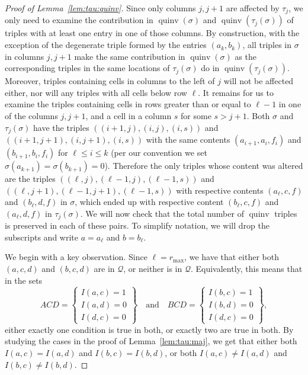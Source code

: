 \documentclass[11pt]{article}
\theoremstyle{definition}
\numberwithin{equation}{section}
\DeclareMathOperator{\quinv}{quinv}
\newcommand{\cQ}{\mathcal{Q}}
\begin{document}
\begin{proof}[Proof of Lemma~\ref{lem:tau:quinv}]
Since only columns $j,j+1$ are affected by $\tau_j$, we only need to examine the contribution in $\quinv(\sigma)$ and $\quinv(\tau_j(\sigma))$ of triples with at least one entry in one of those columns. By construction, with the exception of the degenerate triple formed by the entries $(a_k,b_k)$, all triples in $\sigma$ in columns $j,j+1$ make the same contribution in $\quinv(\sigma)$ as the corresponding triples in the same locations of $\tau_j(\sigma)$ do in $\quinv(\tau_j(\sigma))$. Moreover, triples containing cells in columns to the left of $j$ will not be affected either, nor will any triples with all cells below row $\ell$. It remains for us to examine the triples containing cells in rows greater than or equal to $\ell-1$ in one of the columns $j,j+1$, and a cell in a column $s$ for some $s>j+1$. Both $\sigma$ and $\tau_j(\sigma)$ have the triples $((i+1,j),(i,j),(i,s))$ and $((i+1,j+1),(i,j+1),(i,s))$ with the same contents $(a_{i+1},a_i,f_i)$ and $(b_{i+1},b_i,f_i)$ for $\ell\leq i \leq k$ (per our convention we set $\sigma(a_{k+1})=\sigma(b_{k+1})=0$). Therefore the only triples whose content was altered are the triples $((\ell,j),(\ell-1,j),(\ell-1,s))$ and $((\ell,j+1),(\ell-1,j+1),(\ell-1,s))$ with respective contents $(a_{\ell},c,f)$ and $(b_{\ell},d,f)$ in $\sigma$, which ended up with respective content $(b_{\ell},c,f)$ and $(a_{\ell},d,f)$ in $\tau_j(\sigma)$. We will now check that the total number of $\quinv$ triples is preserved in each of these pairs. To simplify notation, we will drop the subscripts and write $a=a_{\ell}$ and $b=b_{\ell}$.


We begin with a key observation. Since $\ell=r_{\max}$, we have that either both $(a,c,d)$ and $(b,c,d)$ are in $\cQ$, or neither is in $\cQ$. Equivalently, this means that in the sets
\[ 
ACD = \left\{\begin{matrix}I(a,c)=1\\I(a,d)=0\\I(d,c)=0 \end{matrix} \right\} 
\quad \mbox{and} \quad 
BCD = \left\{\begin{matrix}I(b,c)=1\\I(b,d)=0\\I(d,c)=0 \end{matrix} \right\},
\]
either exactly one condition is true in both, or exactly two are true in both. By studying the cases in the proof of Lemma~\ref{lem:tau:maj}, we get that either both $I(a,c)=I(a,d)$ and $I(b,c)=I(b,d)$, or both $I(a,c)\neq I(a,d)$ and $I(b,c)\neq I(b,d)$. 


\end{proof}
\end{document}
